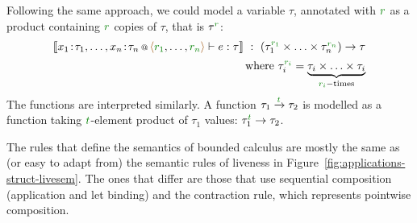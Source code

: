 Following the same approach, we could model a variable $\tau$, annotated with $\cclrd{r}$ as 
a product containing $\cclrd{r}$ copies of $\tau$, that is $\tau^{\cclrd{r}}$:
%
\begin{equation*}
\begin{array}{r}
\sem{\coctx{x_1\!:\!\tau_1, \ldots, x_n\!:\!\tau_n}{ \alift{\cclrd{r_1}, \ldots, \cclrd{r_n}} } \vdash e : \tau} 
  ~:~ (\tau^{\cclrd{r_1}}_1 \times \ldots \times \tau^{\cclrd{r_n}}_n) \rightarrow \tau\\[0.5em]
\textnormal{where}~\tau^{\cclrd{r_i}}_i = \underbrace{\tau_i \times \ldots \times \tau_i}_{\cclrd{r_i}-\text{times}}
\end{array}
\end{equation*}
%
The functions are interpreted similarly. A function $\tau_1 \xrightarrow{\cclrd{t}} \tau_2$ is modelled
as a function taking $\cclrd{t}$-element product of $\tau_1$ values: $\tau_1^{\cclrd{t}} \rightarrow \tau_2$.

The rules that define the semantics of bounded calculus are mostly the same as (or easy to adapt 
from) the semantic rules of liveness in Figure~\ref{fig:applications-struct-livesem}. The ones that
differ are those that use sequential composition (application and let binding) and the contraction
rule, which represents pointwise composition. 

